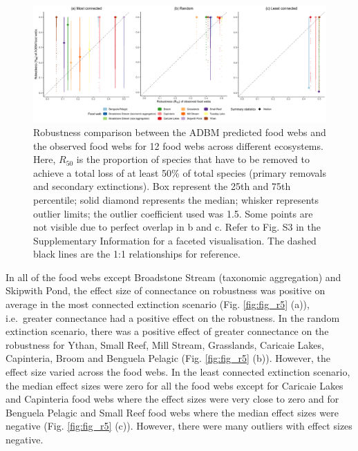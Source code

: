 \documentclass{article}
\begin{document}
\begin{figure}

{\centering \includegraphics[width=450px]{../results/plot_R50_ADBM_vs_obs} 

}

\caption{\label{fig:fig_r4} Robustness comparison between the ADBM predicted food webs and the observed food webs for 12 food webs across different ecosystems. Here, $R_{50}$ is the proportion of species that have to be removed to achieve a total loss of at least 50\% of total species (primary removals and secondary extinctions). Box represent the 25th and 75th percentile; solid diamond represents the median; whisker represents outlier limits; the outlier coefficient used was 1.5. Some points are not visible due to perfect overlap in b and c. Refer to Fig. S3 in the Supplementary Information for a faceted visualisation. The dashed black lines are the 1:1 relationships for reference.}\label{fig:unnamed-chunk-2}
\end{figure}

In all of the food webs except Broadstone Stream (taxonomic aggregation)
and Skipwith Pond, the effect size of connectance on robustness was
positive on average in the most connected extinction scenario (Fig.
\ref{fig:fig_r5} (a)), i.e.~greater connectance had a positive effect on
the robustness. In the random extinction scenario, there was a positive
effect of greater connectance on the robustness for Ythan, Small Reef,
Mill Stream, Grasslands, Caricaie Lakes, Capinteria, Broom and Benguela
Pelagic (Fig. \ref{fig:fig_r5} (b)). However, the effect size varied
across the food webs. In the least connected extinction scenario, the
median effect sizes were zero for all the food webs except for Caricaie
Lakes and Capinteria food webs where the effect sizes were very close to
zero and for Benguela Pelagic and Small Reef food webs where the median
effect sizes were negative (Fig. \ref{fig:fig_r5} (c)). However, there
were many outliers with effect sizes negative.
\end{document}
